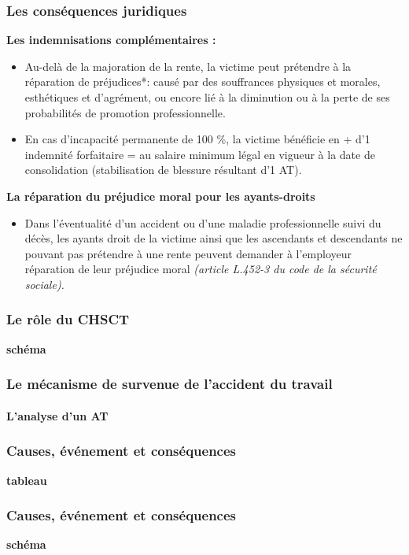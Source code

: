 \documentclass{beamer}
\begin{document}
\begin{frame}
\frametitle{Les conséquences juridiques}

\textbf{Les indemnisations complémentaires :}
\begin{itemize}
\item Au-delà de la majoration de la rente, la victime peut prétendre à la réparation de préjudices*:  causé par des souffrances physiques et morales, esthétiques et d’agrément, ou encore lié à la diminution ou à la perte de ses probabilités de promotion professionnelle. 
\item En cas d’incapacité permanente de 100 \%, la victime bénéficie en + d’1 indemnité forfaitaire = au salaire minimum légal en vigueur à la date de consolidation (stabilisation de blessure résultant d’1 AT). 
\end{itemize}

\textbf{La réparation du préjudice moral pour les ayants-droits}
\begin{itemize}
\item Dans l’éventualité d’un accident ou d’une maladie professionnelle suivi du décès, les ayants droit de la victime ainsi que les ascendants et descendants ne pouvant pas prétendre à une rente peuvent demander à l’employeur réparation de leur préjudice moral \textit{(article L.452-3 du code de la sécurité sociale). }
\end{itemize}
\end{frame}

\begin{frame}
\frametitle{Le rôle du CHSCT}

\textbf{schéma}
\end{frame}

\begin{frame}
\frametitle{Le mécanisme de survenue de l’accident du travail}
\framesubtitle{L’analyse d'un AT}

\end{frame}

\begin{frame}
\frametitle{Causes, événement et conséquences}

\textbf{tableau}
\end{frame}

\begin{frame}
\frametitle{Causes, événement et conséquences}

\textbf{schéma}
\end{frame}
\end{document}
